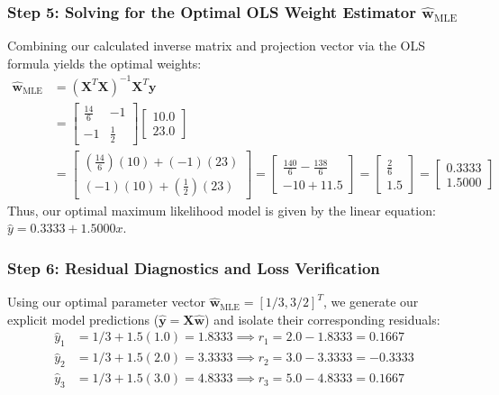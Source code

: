 \documentclass{article}
\begin{document}
\subsubsection{Step 5: Solving for the Optimal OLS Weight Estimator $\hat{\mathbf{w}}_{\text{MLE}}$}
Combining our calculated inverse matrix and projection vector via the OLS formula yields the optimal weights:
\begin{align*}
\hat{\mathbf{w}}_{\text{MLE}} &= \left(\mathbf{X}^T \mathbf{X}\right)^{-1} \mathbf{X}^T \mathbf{y} \\
&= \begin{bmatrix} \frac{14}{6} & -1 \\ -1 & \frac{1}{2} \end{bmatrix} \begin{bmatrix} 10.0 \\ 23.0 \end{bmatrix} \\
&= \begin{bmatrix} \left(\frac{14}{6}\right)(10) + (-1)(23) \\ (-1)(10) + \left(\frac{1}{2}\right)(23) \end{bmatrix} = \begin{bmatrix} \frac{140}{6} - \frac{138}{6} \\ -10 + 11.5 \end{bmatrix} = \begin{bmatrix} \frac{2}{6} \\ 1.5 \end{bmatrix} = \begin{bmatrix} \mathbf{0.3333} \\ \mathbf{1.5000} \end{bmatrix}
\end{align*}
Thus, our optimal maximum likelihood model is given by the linear equation: $\hat{y} = 0.3333 + 1.5000x$.

\subsubsection{Step 6: Residual Diagnostics and Loss Verification}
Using our optimal parameter vector $\hat{\mathbf{w}}_{\text{MLE}} = [1/3, 3/2]^T$, we generate our explicit model predictions ($\hat{\mathbf{y}} = \mathbf{X}\hat{\mathbf{w}}$) and isolate their corresponding residuals:
\begin{align}
\hat{y}_1 &= 1/3 + 1.5(1.0) = 1.8333 \implies r_1 = 2.0 - 1.8333 = \mathbf{0.1667} \\
\hat{y}_2 &= 1/3 + 1.5(2.0) = 3.3333 \implies r_2 = 3.0 - 3.3333 = \mathbf{-0.3333} \\
\hat{y}_3 &= 1/3 + 1.5(3.0) = 4.8333 \implies r_3 = 5.0 - 4.8333 = \mathbf{0.1667}
\end{align}
\end{document}
